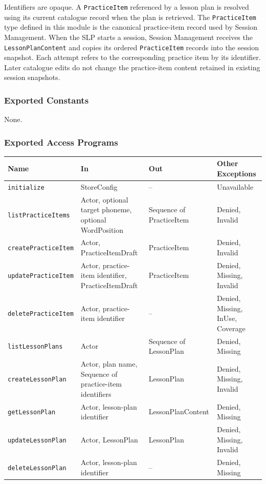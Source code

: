 \documentclass[12pt, titlepage]{article}
\begin{document}
Identifiers are opaque. A \texttt{PracticeItem} referenced by a lesson plan
is resolved using its current catalogue record when the plan is retrieved.
The \texttt{PracticeItem} type defined in this module is the canonical
practice-item record used by Session Management. When the SLP starts a
session, Session Management receives the \texttt{LessonPlanContent} and
copies its ordered \texttt{PracticeItem} records into the session snapshot.
Each attempt refers to the corresponding practice item by its identifier.
Later catalogue edits do not change the practice-item content retained in
existing session snapshots.

\subsubsection{Exported Constants}
None.

\subsubsection{Exported Access Programs}
\noindent\begin{tabularx}{\textwidth}{@{}l L >{\raggedright\arraybackslash}p{3.5cm} >{\raggedright\arraybackslash}p{3cm}@{}}
\toprule
\textbf{Name} & \textbf{In} & \textbf{Out} & \textbf{Other Exceptions}\\
\midrule
\texttt{initialize} & StoreConfig & -- & Unavailable\\
\texttt{listPracticeItems} & Actor, optional target phoneme, optional WordPosition & Sequence of PracticeItem & Denied, Invalid\\
\texttt{createPracticeItem} & Actor, PracticeItemDraft & PracticeItem & Denied, Invalid\\
\texttt{updatePracticeItem} & Actor, practice-item identifier, PracticeItemDraft & PracticeItem & Denied, Missing, Invalid\\
\texttt{deletePracticeItem} & Actor, practice-item identifier & -- & Denied, Missing, InUse, Coverage\\
\texttt{listLessonPlans} & Actor & Sequence of LessonPlan & Denied, Missing\\
\texttt{createLessonPlan} & Actor, plan name, Sequence of practice-item identifiers & LessonPlan & Denied, Missing, Invalid\\
\texttt{getLessonPlan} & Actor, lesson-plan identifier & LessonPlanContent & Denied, Missing\\
\texttt{updateLessonPlan} & Actor, LessonPlan & LessonPlan & Denied, Missing, Invalid\\
\texttt{deleteLessonPlan} & Actor, lesson-plan identifier & -- & Denied, Missing\\
\bottomrule
\end{tabularx}
\end{document}
